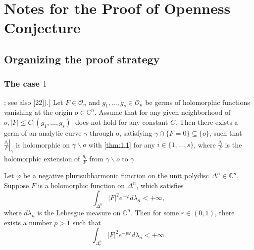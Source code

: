 \chapter{Notes for the Proof of Openness Conjecture}

\section{Organizing the proof strategy}
\subsection{The case \texorpdfstring{$1$}{}}

\begin{lemma}[Lemma 2.3 (see [8]; see also [22]).]\label{lem:2.3}
     Let $F \in \mathcal{O}_n$ and $g_1, \ldots, g_s \in \mathcal{O}_n$ be germs of holomorphic functions vanishing at the origin $o \in \mathbb{C}^n$. Assume that for any given neighborhood of $o,|F| \leq C\left|\left(g_1, \ldots, g_s\right)\right|$ does not hold for any constant $C$. Then there exists a germ of an analytic curve $\gamma$ through o, satisfying $\gamma \cap\{F=0\} \subseteq\{o\}$, such that $\left.\frac{g_i}{F}\right|_\gamma$ is holomorphic on $\gamma \backslash o$ with \ref{thm:1.1} for any $i \in\{1, \ldots, s\}$, where $\frac{\widetilde{g_i}}{F}$ is the holomorphic extension of $\frac{g_i}{F}$ from $\gamma \backslash o$ to $\gamma$.
\end{lemma}

\begin{theorem}\label{thm:1.1}
    Let $\varphi$ be a negative plurisubharmonic function on the unit polydisc
    $\Delta^n \in \mathbb{C}^n$. Suppose $F$ is a holomorphic function on
    $\Delta^n$, which satisfies
    \[ \int_{\Delta^n} | F |^2 e^{- \varphi} d \lambda_n < + \infty, \]
    where $d \lambda_n$ is the Lebesgue measure on $\mathbb{C}^n$. Then for some
$r \in (0, 1)$, there exists a number $p > 1$ such that
\[ \int_{\Delta^n_r} | F |^2 e^{- p \varphi} d \lambda_n < + \infty . \]
\end{theorem}

